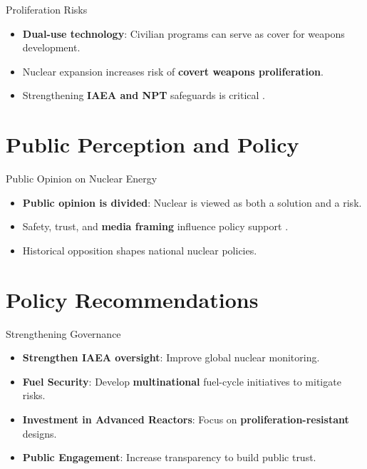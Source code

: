 \documentclass{beamer}
\begin{document}
\begin{frame}{Proliferation Risks}
    \begin{itemize}
        \item \textbf{Dual-use technology}: Civilian programs can serve as cover for weapons development.
        \item Nuclear expansion increases risk of \textbf{covert weapons proliferation}.
        \item Strengthening \textbf{IAEA and NPT} safeguards is critical \cite{Goldschmidt2010multilateral}.
    \end{itemize}
\end{frame}


\section{Public Perception and Policy}
\begin{frame}{Public Opinion on Nuclear Energy}
    \begin{itemize}
        \item \textbf{Public opinion is divided}: Nuclear is viewed as both a solution and a risk.
        \item Safety, trust, and \textbf{media framing} influence policy support \cite{Doyle}.
        \item Historical opposition shapes national nuclear policies.
    \end{itemize}
\end{frame}


\section{Policy Recommendations}
\begin{frame}{Strengthening Governance}
    \begin{itemize}
        \item \textbf{Strengthen IAEA oversight}: Improve global nuclear monitoring.
        \item \textbf{Fuel Security}: Develop \textbf{multinational} fuel-cycle initiatives to mitigate risks.
        \item \textbf{Investment in Advanced Reactors}: Focus on \textbf{proliferation-resistant} designs.
        \item \textbf{Public Engagement}: Increase transparency to build public trust.
    \end{itemize}
\end{frame}
\end{document}
